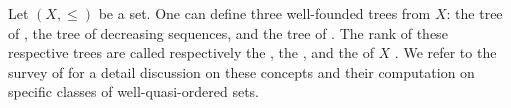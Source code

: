 Let $(X, \leq)$ be a  set. One can define three
well-founded trees from $X$: the tree of , the tree of
decreasing sequences, and the tree of . The rank of these
respective trees are called respectively the 
\cite{dejongh77}, the  \cite{schmidt81}, and the  of $X$ \cite{kriz90b}. We refer to the survey of \cite{DZSCSC20} for a
detail discussion on these concepts and their computation on specific classes
of well-quasi-ordered sets.




